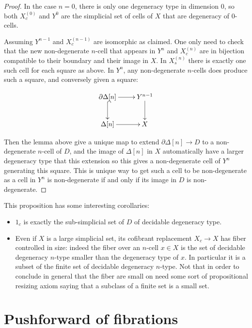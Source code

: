 \documentclass[reqno,10pt,a4paper,oneside,draft]{amsart}
\begin{document}
\begin{proof}
In the case $n=0$, there is only one degeneracy type in dimension $0$, so both $X^{(0)}_c$ and $Y^0$ are the simplicial set of cells of $X$ that are degeneracy of $0$-cells.

Assuming $Y^{n-1}$ and $X^{(n-1)}_c$ are isomorphic as claimed. One only need to check that the new non-degenerate $n$-cell that appears in $Y^{n}$ and $X^{(n)}_c$ are in bijection compatible to their boundary and their image in $X$.
In $X^{(n)}_s$ there is exactly one such cell for each square as above. In $Y^{n}$, any non-degenerate $n$-cells does produce such a square, and conversely given a square:

\[ \xymatrix{\partial \Delta[n]  \ar[r] \ar@{^{(}->}[d] & Y^{n-1} \ar[d] \\ \Delta[n]  \ar[r] & X} \]

Then the lemma above give a unique map to extend $\partial \Delta[n] \rightarrow D$ to a non-degenerate $n$-cell of $D$, and the image of $\Delta[n]$ in $X$ automatically have a larger degeneracy type that this extension so this gives a non-degenerate cell of $Y^{n}$ generating this square. This is unique way to get such a cell to be non-degenerate as a cell in $Y^n$ is non-degenerate if and only if its image in $D$ is non-degenerate.

\end{proof}


This proposition has some interesting corollaries:

\begin{itemize}

\item $1_c$ is exactly the sub-simplicial set of $D$ of decidable degeneracy type.

\item Even if $X$ is a large simplicial set, its cofibrant replacement $X_c \rightarrow X$ has fiber controlled in size: indeed the fiber over an $n$-cell $x \in X$ is the set of decidable degeneracy $n$-type smaller than the degeneracy type of $x$. In particular it is a subset of the finite set of decidable degeneracy $n$-type. Not that in order to conclude in general that the fiber are small on need some sort of propositional resizing axiom saying that a subclass of a finite set is a small set.

\end{itemize}

\newpage

\section{Pushforward of fibrations}
\end{document}
